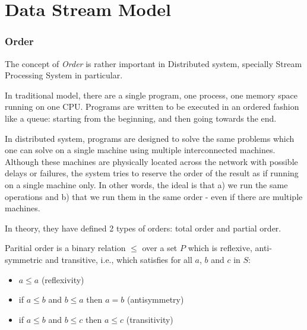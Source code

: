 
\chapter{Data Stream Model}

\ifpdf
    \graphicspath{{Chapter2/Figs/Raster/}{Chapter2/Figs/PDF/}{Chapter2/Figs/}}
\else
    \graphicspath{{Chapter2/Figs/Vector/}{Chapter2/Figs/}}
\fi


\subsection*{Order}
The concept of \textit{Order} is rather important in Distributed system, specially Stream Processing System in particular. 

In traditional model, there are a single program, one process, one memory space running on one CPU. Programs are written to be executed in an ordered fashion like a queue:  starting from the beginning, and then going towards the end. 

In distributed system, programs are designed to solve the same problems which one can solve on a single machine using multiple interconnected machines. Although these machines are physically located across the network with possible delays or failures, the system tries to reserve the order of the result as if running on a single machine only. In other words, the ideal is that a) we run the same operations and b) that we run them in the same order - even if there are multiple machines\citep{Mikito:2014}.

In theory, they have defined 2 types of orders: total order and partial order. 

\begin{defi}
 Paritial order \citep{Simovici:2008} is a binary relation $\leq$ over a set $P$ which is reflexive, anti-symmetric and transitive, i.e., which satisfies for all $a$, $b$ and $c$ in $S$:
 
 \begin{itemize}
	 \item $a \leq a$ (reflexivity)
	\item  if $a \leq b$ and $b \leq a$ then $a = b$ (antisymmetry) 
	\item if $a \leq b$ and $b \leq c$ then $a \leq c$  (transitivity)
\end{itemize}
\end{defi}

